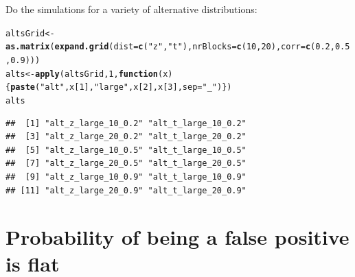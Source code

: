 \documentclass{article}\usepackage[]{graphicx}\usepackage[]{color}
\makeatletter
\newcommand{\hlnum}[1]{\textcolor[rgb]{0.686,0.059,0.569}{#1}}%
\newcommand{\hlstr}[1]{\textcolor[rgb]{0.192,0.494,0.8}{#1}}%
\newcommand{\hlstd}[1]{\textcolor[rgb]{0.345,0.345,0.345}{#1}}%
\newcommand{\hlkwa}[1]{\textcolor[rgb]{0.161,0.373,0.58}{\textbf{#1}}}%
\newcommand{\hlkwb}[1]{\textcolor[rgb]{0.69,0.353,0.396}{#1}}%
\newcommand{\hlkwc}[1]{\textcolor[rgb]{0.333,0.667,0.333}{#1}}%
\newcommand{\hlkwd}[1]{\textcolor[rgb]{0.737,0.353,0.396}{\textbf{#1}}}%
\newenvironment{kframe}{%
 \def\at@end@of@kframe{}%
 \ifinner\ifhmode%
  \def\at@end@of@kframe{\end{minipage}}%
  \begin{minipage}{\columnwidth}%
 \fi\fi%
 \def\FrameCommand##1{\hskip\@totalleftmargin \hskip-\fboxsep
 \colorbox{shadecolor}{##1}\hskip-\fboxsep
     \hskip-\linewidth \hskip-\@totalleftmargin \hskip\columnwidth}%
 \MakeFramed {\advance\hsize-\width
   \@totalleftmargin\z@ \linewidth\hsize
   \@setminipage}}%
 {\par\unskip\endMakeFramed%
 \at@end@of@kframe}
\newenvironment{knitrout}{}{} %
\makeatother
\begin{document}
Do the simulations for a variety of alternative distributions:
\begin{knitrout}
\color{fgcolor}\begin{kframe}
\begin{alltt}
\hlstd{altsGrid} \hlkwb{<-} \hlkwd{as.matrix}\hlstd{(}\hlkwd{expand.grid}\hlstd{(}\hlkwc{dist}\hlstd{=}\hlkwd{c}\hlstd{(}\hlstr{"z"}\hlstd{,}\hlstr{"t"}\hlstd{),}\hlkwc{nrBlocks}\hlstd{=}\hlkwd{c}\hlstd{(}\hlnum{10}\hlstd{,}\hlnum{20}\hlstd{),}\hlkwc{corr}\hlstd{=}\hlkwd{c}\hlstd{(}\hlnum{0.2}\hlstd{,}\hlnum{0.5}\hlstd{,}\hlnum{0.9}\hlstd{)))}
\hlstd{alts} \hlkwb{<-} \hlkwd{apply}\hlstd{(altsGrid,} \hlnum{1}\hlstd{,} \hlkwa{function}\hlstd{(}\hlkwc{x}\hlstd{)\{}\hlkwd{paste}\hlstd{(}\hlstr{"alt"}\hlstd{,x[}\hlnum{1}\hlstd{],}\hlstr{"large"}\hlstd{,x[}\hlnum{2}\hlstd{],x[}\hlnum{3}\hlstd{],}\hlkwc{sep}\hlstd{=}\hlstr{"_"}\hlstd{)\})}
\hlstd{alts}
\end{alltt}
\begin{verbatim}
##  [1] "alt_z_large_10_0.2" "alt_t_large_10_0.2"
##  [3] "alt_z_large_20_0.2" "alt_t_large_20_0.2"
##  [5] "alt_z_large_10_0.5" "alt_t_large_10_0.5"
##  [7] "alt_z_large_20_0.5" "alt_t_large_20_0.5"
##  [9] "alt_z_large_10_0.9" "alt_t_large_10_0.9"
## [11] "alt_z_large_20_0.9" "alt_t_large_20_0.9"
\end{verbatim}
\end{kframe}
\end{knitrout}

\section{Probability of being a false positive is flat}
\end{document}
